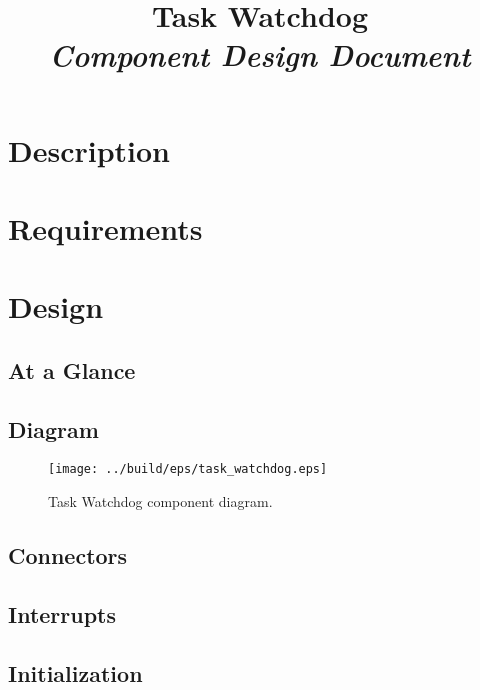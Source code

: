 



\title{\textbf{Task Watchdog} \\
\large\textit{Component Design Document}}
\date{}
\maketitle

\section{Description}


\section{Requirements}


\section{Design}

\subsection{At a Glance}


\subsection{Diagram}
\begin{figure}[H]
  \texttt{[image: ../build/eps/task\_watchdog.eps]}
  \caption{Task Watchdog component diagram.}
\end{figure}

\subsection{Connectors}


\subsection{Interrupts}



\subsection{Initialization}


